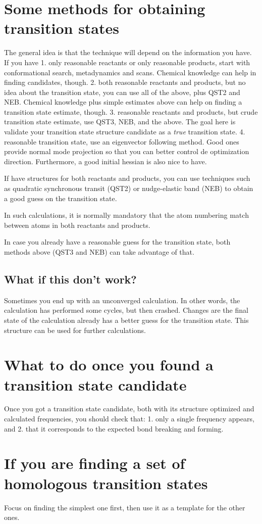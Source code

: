 \section{Some methods for obtaining transition states}

The general idea is that the technique will depend on the information you have.
If you have
1. only reasonable reactants or only reasonable products, start with conformational search,
metadynamics and scans. Chemical knowledge can help in finding candidates,
though.
2. both reasonable reactants and products, but no idea about the transition state, you can use
all of the above, plus QST2 and NEB. Chemical knowledge plus simple estimates
above can help on finding a transition state estimate, though.
3. reasonable reactants and products, but crude transition state estimate, use QST3, NEB, and the above. The
goal here is validate your transition state structure candidate as a
\emph{true} transition state.
4. reasonable transition state, use an eigenvector following method. Good ones
provide normal mode projection so that you can better control de optimization
direction. Furthermore, a good initial hessian is also nice to have.

If have structures for both reactants and products, you can use techniques such
as quadratic synchronous transit (QST2) or nudge-elastic band (NEB) to obtain a
good guess on the transition state.

In such calculations, it is normally mandatory that the atom numbering match
between atoms in both reactants and products.

In case you already have a reasonable guess for the transition state, both
methods above (QST3 and NEB) can take advantage of that.

\subsection{What if this don't work?}

Sometimes you end up with an unconverged calculation.
In other words, the calculation has performed some cycles, but then crashed.
Changes are the final state of the calculation already has a better guess for
the transition state.
This structure can be used for further calculations.

\section{What to do once you found a transition state candidate}

Once you got a transition state candidate, both with its structure optimized
and calculated frequencies, you should check that:
1. only a single frequency appears, and
2. that it corresponds to the expected bond breaking and forming.

\section{If you are finding a set of homologous transition states}

Focus on finding the simplest one first, then use it as a template for the
other ones.
